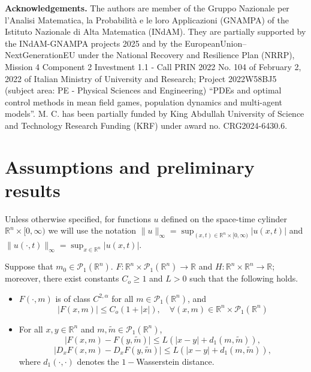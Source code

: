 \documentclass{amsart}
\theoremstyle{remark}
\theoremstyle{definition}
\theoremstyle{Claim}
\newcommand{\R}{\mathbb{R}}
\theoremstyle{plain}
\begin{document}
\bigskip
\textbf{Acknowledgements.} The authors are member of the Gruppo Nazionale per l'Analisi Matematica, la Probabilit\`a e le loro Applicazioni (GNAMPA) of the Istituto Nazionale di Alta Matematica (INdAM). They are partially supported by the INdAM-GNAMPA projects 2025 and by the EuropeanUnion–NextGenerationEU under the National Recovery and Resilience Plan (NRRP), Mission 4 Component 2 Investment 1.1 - Call PRIN 2022 No. 104 of February 2, 2022 of Italian Ministry of University and Research; Project 2022W58BJ5 (subject area: PE - Physical Sciences and Engineering) “PDEs and optimal control methods in mean field games, population dynamics and multi-agent models”. M. C. has been partially funded by King Abdullah University of Science and Technology Research Funding (KRF) under award no. CRG2024-6430.6.


	
\section{Assumptions and preliminary results}

Unless otherwise specified, for functions $u$ defined on the space-time cylinder $\R^n \times [0,\infty)$ we will use the notation $\|u\|_\infty = \sup_{(x,t) \in \R^n \times [0,\infty)} |u(x,t)|$ and $\|u(\cdot, t)\|_\infty = \sup_{x \in \R^n} |u(x,t)|$.

\medskip

Suppose that $m_0\in \mathcal{P}_1(\mathbb{R}^n)$. $F:\mathbb{R}^n\times\mathcal{P}_1(\mathbb{R}^n)\rightarrow\mathbb{R}$ and $H:\mathbb{R}^n\times \mathbb{R}^n\rightarrow\mathbb{R}$; moreover, there exist constants $C_o\geq 1$ and $L > 0$ such that the following holds.
	\begin{itemize}
		\item[(F1)] $F(\cdot, m)$ is of class $C^{2,\alpha}$ for all $m \in \mathcal P_1(\mathbb{R}^n)$, and 
		\begin{equation*}
			\lvert F(x,m)\rvert \leq C_o(1+\lvert x\rvert),\quad \forall (x,m)\in \mathbb{R}^n\times\mathcal{P}_1(\mathbb{R}^n)
		\end{equation*}
		\item[(F2)] For all $ x,y\in \mathbb{R}^n$ and $m,\tilde{m}\in\mathcal{P}_1(\mathbb{R}^n)$,
		\begin{equation*}
			\lvert F(x,m)-F(y,\tilde{m})\rvert\leq L(\lvert x-y\rvert+d_1(m,\tilde{m})),
		\end{equation*}
		\begin{equation*}
			\lvert D_xF(x,m)-D_xF(y,\tilde{m})\rvert\leq L(\lvert x-y\rvert+d_1(m,\tilde{m})),
		\end{equation*}
		where $d_1(\cdot,\cdot)$ denotes the $1-$Wasserstein distance.
	\end{itemize}
	
\end{document}
